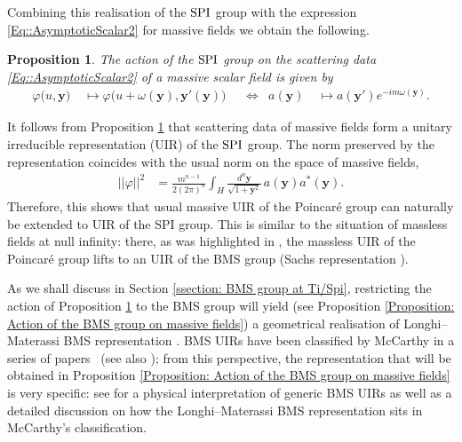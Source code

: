 \documentclass[a4paper, 10pt]{article}
\newtheorem{proposition}{Proposition}[section]
\theoremstyle{remark}
\newcommand{\correc}[1]{#1}
\newcommand{\y}{\bm{y}}
\newcommand{\SPI}{\textnormal{SPI}}%
\begin{document}
Combining this realisation of the $\SPI$ group with the expression \eqref{Eq::AsymptoticScalar2} for massive fields we obtain the following.
\begin{proposition}\label{Proposition: Action of the SPI group on massive fields}
   The action of the $\SPI$ group on the scattering data \eqref{Eq::AsymptoticScalar2} of a massive scalar field is given by
   \begin{align}\label{Action of the SPI group on massive fields}
      \varphi\big(u, \y\big) &\;\mapsto   \varphi\big(u +\omega(\y), \y'(\y)\big) && \Longleftrightarrow &  a(\y) &\;\mapsto a(\y') e^{-im \omega(\y)}.
   \end{align}
\end{proposition}
It follows from Proposition \ref{Proposition: Action of the SPI group on massive fields} that scattering data of massive fields form a unitary irreducible representation (UIR) of the $\SPI$ group. The norm preserved by the representation coincides with the usual norm on the space of massive fields,
\correc{\begin{align*}
    ||\varphi||^2 &= \frac{m^{n-1}}{2 (2\pi)^{n}} \int_{H} \frac{d^{n}\y}{\sqrt{1 + \y ^2}}\, a(\y) a^*(\y).
\end{align*}}
 Therefore, this shows that usual massive UIR of the Poincaré group can naturally be extended to UIR of the SPI group. This is similar to the situation of massless fields at null infinity: there, as was highlighted in \cite{Bekaert:2022ipg}, the massless UIR of the Poincaré group lifts to an UIR of the BMS group (Sachs representation \cite{Sachs:1962zza}).
 
 As we shall discuss in Section \ref{ssection: BMS group at Ti/Spi}, restricting the action of Proposition \ref{Proposition: Action of the SPI group on massive fields} to the BMS group will yield (see Proposition \ref{Proposition: Action of the BMS group on massive fields}) a geometrical realisation of Longhi–Materassi BMS representation \cite{Longhi:1997zt}. \correc{BMS UIRs have been classified by McCarthy in a series of papers~\cite{Mccarthy:1972ry,McCarthy_72-I,McCarthy_73-II,McCarthy_73-III,McCarthy_76-IV,McCarthy_75,McCarthy_78,McCarthy_78errata} (see also \cite{Girardello:1974sq}); from this perspective, the representation that will be obtained in Proposition \ref{Proposition: Action of the BMS group on massive fields} is very specific: see \cite{Bekaert:2024jxs,Bekaert:2025kjb} for a physical interpretation of generic BMS UIRs as well as a detailed discussion on how the Longhi–Materassi BMS representation sits in McCarthy's classification.}
\end{document}
